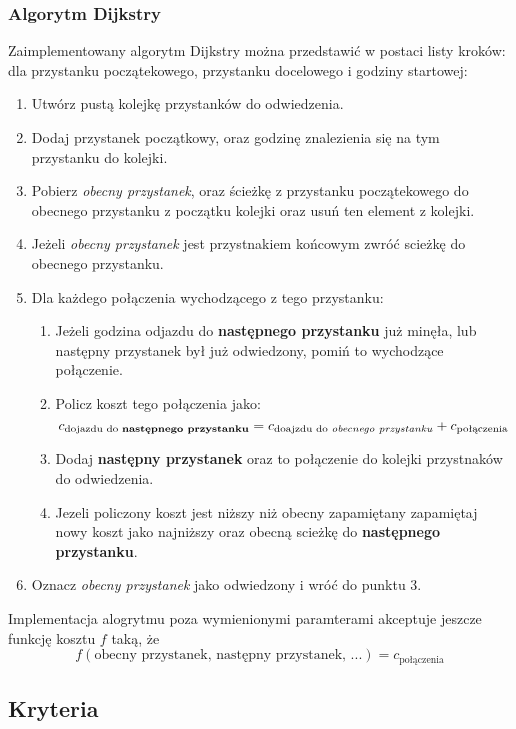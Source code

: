 \documentclass[12pt,a4paper]{article}
\begin{document}
    \subsubsection*{Algorytm Dijkstry}
    \noindent
    Zaimplementowany algorytm Dijkstry można przedstawić w postaci listy kroków:
    dla przystanku początekowego, przystanku docelowego i godziny startowej:
    \begin{enumerate}
        \item Utwórz pustą kolejkę przystanków do odwiedzenia.
        \item Dodaj przystanek początkowy, oraz godzinę znalezienia się na tym przystanku do kolejki.
        \item Pobierz \emph{obecny przystanek}, oraz ścieżkę z przystanku początekowego do obecnego przystanku z początku kolejki oraz usuń ten element z kolejki.
        \item Jeżeli \emph{obecny przystanek} jest przystnakiem końcowym zwróć scieżkę do obecnego przystanku.
        \item Dla każdego połączenia wychodzącego z tego przystanku: \begin{enumerate}
            \item Jeżeli godzina odjazdu do \textbf{następnego przystanku} już minęła, lub następny przystanek był już odwiedzony, pomiń to wychodzące połączenie.
            \item Policz koszt tego połączenia jako: $$c_{\text{dojazdu do \textbf{następnego przystanku}}} = c_{\text{doajzdu do \emph{obecnego przystanku}}} + c_{\text{połączenia}}$$
            \item Dodaj \textbf{następny przystanek} oraz to połączenie do kolejki przystnaków do odwiedzenia.
            \item Jezeli policzony koszt jest niższy niż obecny zapamiętany zapamiętaj nowy koszt jako najniższy oraz obecną scieżkę do \textbf{następnego przystanku}.
        \end{enumerate}
        \item Oznacz \emph{obecny przystanek} jako odwiedzony i wróć do punktu 3.
    \end{enumerate}
    Implementacja alogrytmu poza wymienionymi paramterami akceptuje jeszcze funkcję kosztu $f$ taką, że $$f(\text{obecny przystanek, następny przystanek, ...}) = c_{\text{połączenia}}$$
    \subsection*{Kryteria}
\end{document}
